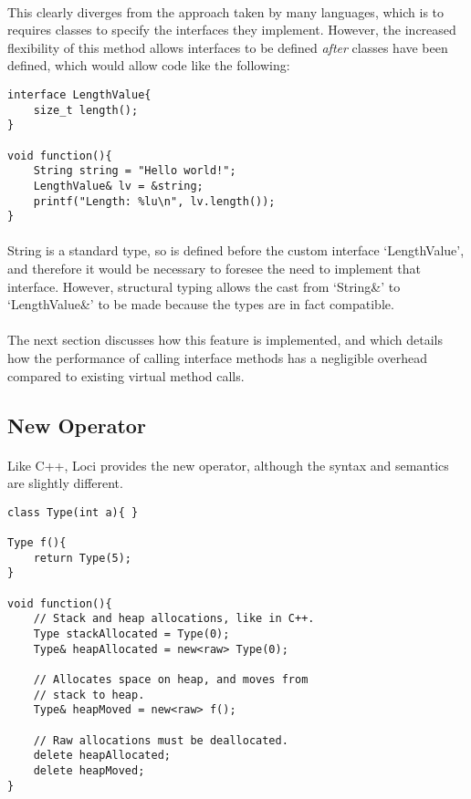 \documentclass[12pt,twoside,notitlepage]{report}
\begin{document}
\paragraph{}
This clearly diverges from the approach taken by many languages, which is to requires classes to specify the interfaces they implement. However, the increased flexibility of this method allows interfaces to be defined \emph{after} classes have been defined, which would allow code like the following:

\small{
\begin{verbatim}
interface LengthValue{
    size_t length();
}

void function(){
    String string = "Hello world!";
    LengthValue& lv = &string;
    printf("Length: %lu\n", lv.length());
}
\end{verbatim}
}

\paragraph{}
String is a standard type, so is defined before the custom interface `LengthValue', and therefore it would be necessary to foresee the need to implement that interface. However, structural typing allows the cast from `String\&' to `LengthValue\&' to be made because the types are in fact compatible.

\paragraph{}
The next section discusses how this feature is implemented, and which details how the performance of calling interface methods has a negligible overhead compared to existing virtual method calls.

\subsection{New Operator}

\paragraph{}
Like C++, Loci provides the new operator, although the syntax and semantics are slightly different.

\small{
\begin{verbatim}
class Type(int a){ }

Type f(){
    return Type(5);
}

void function(){
    // Stack and heap allocations, like in C++.
    Type stackAllocated = Type(0);
    Type& heapAllocated = new<raw> Type(0);
    
    // Allocates space on heap, and moves from
    // stack to heap.
    Type& heapMoved = new<raw> f();
    
    // Raw allocations must be deallocated.
    delete heapAllocated;
    delete heapMoved;
}
\end{verbatim}
}
\end{document}
